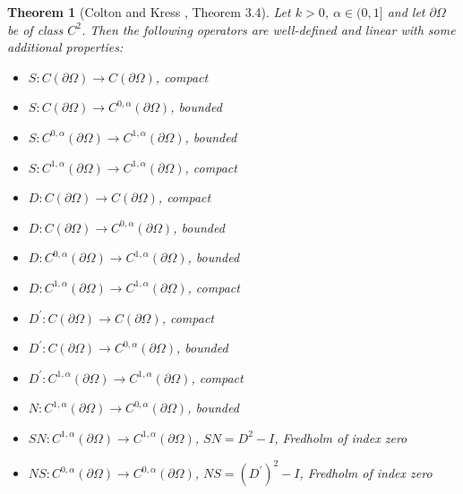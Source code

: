 \documentclass{article}
\theoremstyle{plain}
\newtheorem{thm}{Theorem}[section]
\theoremstyle{definition}
\begin{document}
\begin{thm}[Colton and Kress \cite{colton1998inverse}, Theorem 3.4]
    Let $k>0$, $\alpha\in(0,1]$ and let $\partial\Omega$ be of class $C^2$. Then the following operators are well-defined and linear with some additional properties:
    \begin{itemize}
        \item $S:C(\partial\Omega)\to C(\partial\Omega)$, compact
        \item $S:C(\partial\Omega)\to C^{0,\alpha}(\partial\Omega)$, bounded
        \item $S:C^{0,\alpha}(\partial\Omega)\to C^{1,\alpha}(\partial\Omega)$, bounded
        \item $S:C^{1,\alpha}(\partial\Omega)\to C^{1,\alpha}(\partial\Omega)$, compact
        \item $D:C(\partial\Omega)\to C(\partial\Omega)$, compact
        \item $D:C(\partial\Omega)\to C^{0,\alpha}(\partial\Omega)$, bounded
        \item $D:C^{0,\alpha}(\partial\Omega)\to C^{1,\alpha}(\partial\Omega)$, bounded
        \item $D:C^{1,\alpha}(\partial\Omega)\to C^{1,\alpha}(\partial\Omega)$, compact
        \item $D^\prime:C(\partial\Omega)\to C(\partial\Omega)$, compact
        \item $D^\prime:C(\partial\Omega)\to C^{0,\alpha}(\partial\Omega)$, bounded
        \item $D^\prime:C^{1,\alpha}(\partial\Omega)\to C^{1,\alpha}(\partial\Omega)$, compact
        \item $N:C^{1,\alpha}(\partial\Omega)\to C^{0,\alpha}(\partial\Omega)$, bounded
        \item $SN:C^{1,\alpha}(\partial\Omega)\to C^{1,\alpha}(\partial\Omega)$, $SN=D^2-I$, Fredholm of index zero
        \item $NS:C^{0,\alpha}(\partial\Omega)\to C^{0,\alpha}(\partial\Omega)$, $NS=(D^\prime)^2 - I$, Fredholm of index zero
    \end{itemize}
\end{thm}
\end{document}

